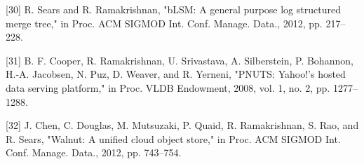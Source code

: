[30] R. Sears and R. Ramakrishnan, "bLSM: A general purpose log structured merge tree," in Proc. ACM SIGMOD Int. Conf. Manage. Data., 2012, pp. 217–228.

[31] B. F. Cooper, R. Ramakrishnan, U. Srivastava, A. Silberstein, P. Bohannon, H.-A. Jacobsen, N. Puz, D. Weaver, and R. Yerneni, "PNUTS: Yahoo!’s hosted data serving platform," in Proc. VLDB Endowment, 2008, vol. 1, no. 2, pp. 1277–1288.

[32] J. Chen, C. Douglas, M. Mutsuzaki, P. Quaid, R. Ramakrishnan, S. Rao, and R. Sears, "Walnut: A unified cloud object store," in Proc. ACM SIGMOD Int. Conf. Manage. Data., 2012, pp. 743–754.

